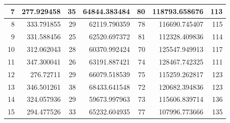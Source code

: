 \begin{table}
\begin{adjustwidth}{}{}
{{\begin{tabular}{|r|r|r|r|r|r|r|}
\hline
7                                          & 277.929458                   & 35                                    & 64844.383484                   & 80                                    & 118793.658676                & 113                                    \\ 
\hline
8                                          & 333.791855                   & 29                                    & 62119.790359                   & 78                                    & 116690.745407                & 115                                    \\ 
\hline
9                                          & 331.588456                   & 25                                    & 62520.697372                   & 81                                    & 112328.409836                & 114                                    \\ 
\hline
10                                         & 312.062043                   & 28                                    & 60370.992424                   & 70                                    & 125547.949913                & 117                                    \\ 
\hline
11                                         & 347.300041                   & 26                                    & 63191.887421                   & 74                                    & 128467.742325                & 111                                    \\ 
\hline
12                                         & 276.72711                    & 29                                    & 66079.518539                   & 75                                    & 115259.262817                & 123                                    \\ 
\hline
13                                         & 346.501261                   & 38                                    & 68433.641548                   & 72                                    & 120682.394836                & 123                                    \\ 
\hline
14                                         & 324.057936                   & 29                                    & 59673.997963                   & 73                                    & 115606.839714                & 136                                    \\ 
\hline
15                                         & 294.477526                   & 33                                    & 65232.604935                   & 77                                    & 107996.773666                & 135                                    \\ 

\end{tabular}}}
\end{adjustwidth}
\end{table}
